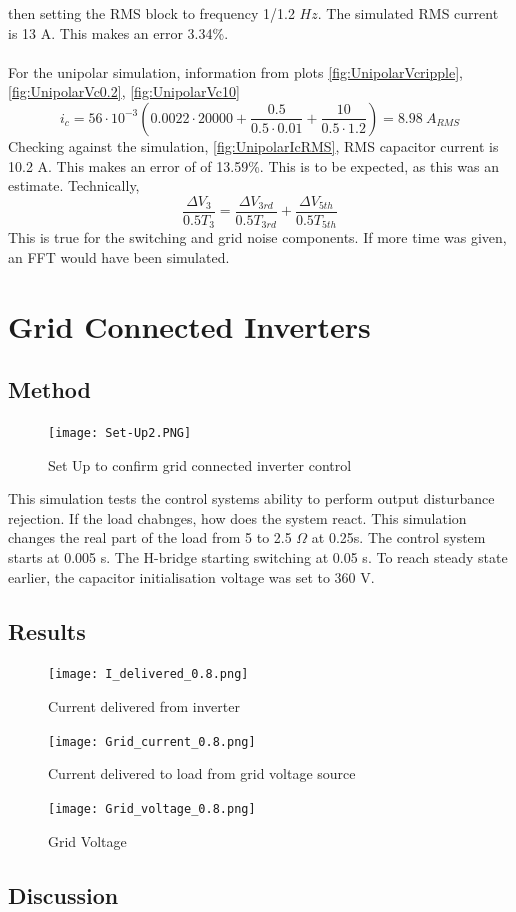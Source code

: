 \documentclass[12pt,twoside]{scrartcl}
\begin{document}
then setting the RMS block to frequency 1/1.2 $Hz$. The simulated RMS current is 13 A. This makes an error 3.34\%.
\\
\\
\noindent
For the unipolar simulation, information from plots \ref{fig:UnipolarVcripple}, \ref{fig:UnipolarVc0.2}, \ref{fig:UnipolarVc10}
\begin{equation}
    i_c = 56\cdot 10^{-3}\left(0.0022\cdot 20000 + \dfrac{0.5}{0.5 \cdot 0.01} + \dfrac{10}{0.5 \cdot 1.2}\right) = 8.98 \: A_{RMS} \tag*{}
\end{equation}
Checking against the simulation, \ref{fig:UnipolarIcRMS}, RMS capacitor current is 10.2 A. This makes an error of of 13.59\%. 
This is to be expected, as this was an estimate. Technically,
\begin{equation}
    \dfrac{\Delta V_3}{0.5T_3} = \dfrac{\Delta V_{3rd}}{0.5T_{3rd}} + \dfrac{\Delta V_{5th}}{0.5T_{5th}}
\end{equation}
This is true for the switching and grid noise components. If more time was given, an FFT would have been simulated. 
\newpage
\section{Grid Connected Inverters}
\subsection{Method}
\begin{figure}[htp]
    \centering
    \texttt{[image: Set-Up2.PNG]}
    \caption{Set Up to confirm grid connected inverter control}
    \label{fig:Real-Set-Up}
\end{figure}
\noindent
This simulation tests the control systems ability to perform output 
disturbance rejection. If the load chabnges,
how does the system react. This simulation changes the real part 
of the load from 5 to 2.5 $\Omega$ at 0.25s. The control system starts at
0.005 s. The H-bridge starting switching at 0.05 s. To reach steady 
state earlier, the capacitor initialisation voltage was set to 360 V.
\newpage
\subsection{Results}
\begin{figure}[htp]
    \centering
    \texttt{[image: I\_delivered\_0.8.png]}
    \caption{Current delivered from inverter}
    \label{fig:deliveredcurrent}
\end{figure}
\begin{figure}[htp]
    \centering
    \texttt{[image: Grid\_current\_0.8.png]}
    \caption{Current delivered to load from grid voltage source}
    \label{fig:gridcurrent}
\end{figure}
\begin{figure}[htp]
    \centering
    \texttt{[image: Grid\_voltage\_0.8.png]}
    \caption{Grid Voltage}
    \label{fig:gridvoltage}
\end{figure}
\newpage
\subsection{Discussion}


\newpage


\end{document}
